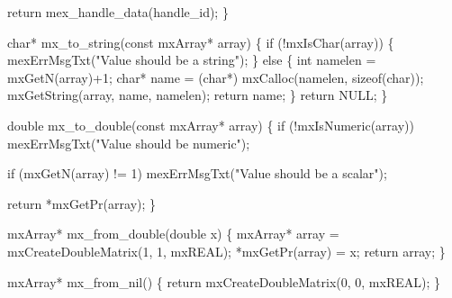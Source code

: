     return mex_handle_data(handle_id);
\}

\nwendcode{}\nwdocspar

\nwenddocs{}\plusendmoddef
char* mx_to_string(const mxArray* array)
\{
    if (!mxIsChar(array)) \{
        mexErrMsgTxt("Value should be a string");
    \} else \{
        int namelen = mxGetN(array)+1;
        char* name  = (char*) mxCalloc(namelen, sizeof(char));
        mxGetString(array, name, namelen);
        return name;
    \}
    return NULL;
\}

\nwendcode{}\nwdocspar

\nwenddocs{}\plusendmoddef
double mx_to_double(const mxArray* array)
\{
    if (!mxIsNumeric(array))
        mexErrMsgTxt("Value should be numeric");

    if (mxGetN(array) != 1)
        mexErrMsgTxt("Value should be a scalar");

    return *mxGetPr(array);
\}

\nwendcode{}\nwdocspar

\nwenddocs{}\plusendmoddef
mxArray* mx_from_double(double x)
\{
    mxArray* array  = mxCreateDoubleMatrix(1, 1, mxREAL);
    *mxGetPr(array) = x;
    return array;
\}

\nwendcode{}\nwdocspar

\nwenddocs{}\plusendmoddef
mxArray* mx_from_nil()
\{
    return mxCreateDoubleMatrix(0, 0, mxREAL);
\}

